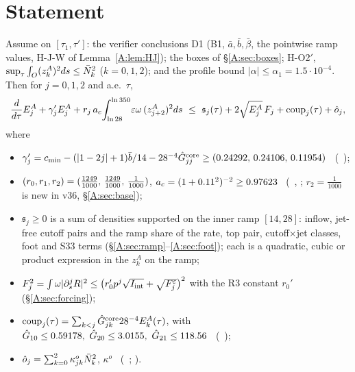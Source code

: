\documentclass[11pt]{article}
\begin{document}
\section{Statement}\label{A:sec:statement}
\begin{proposition}\label{A:prop:level}
Assume on $[\tau_1,\tau']$: the verifier conclusions D1 (B1, $\bar a,\bar b,\bar\beta$, the pointwise ramp values, H-J-W of Lemma~\ref{A:lem:HJ}); the boxes of \S\ref{A:sec:boxes}; H-O2$'$, $\sup_\tau\int_O(z^A_k)^2ds\le\bar N_k^2$ ($k=0,1,2$); and the profile bound $|\alpha|\le\alpha_1=1.5\cdot10^{-4}$. Then for $j=0,1,2$ and a.e.\ $\tau$,
\begin{equation}\label{A:eq:D1}
\frac{d}{d\tau}E^A_j+\gamma'_jE^A_j+r_j\,a_c\!\int_{\ln28}^{\ln350}\!\varepsilon\omega\,(z^A_{j+2})^2ds\ \le\ \mathfrak s_j(\tau)+2\sqrt{E^A_j}\,F_j+\mathrm{coup}_j(\tau)+\oh_j ,
\end{equation}
where
\begin{itemize}[leftmargin=*]
\item $\gamma'_j=c_{\min}-(|1-2j|+1)\bar b/14-28^{-4}\hat G^{\rm core}_{jj}\ge(0.24292,\,0.24106,\,0.11954)$ \tC\ (\SA\ );
\item $(r_0,r_1,r_2)=(\tfrac{1249}{1000},\,\tfrac{1249}{1000},\,\tfrac1{1000})$, $a_c=(1+0.11^2)^{-2}\ge0.97623$ \tC\ (\SA\ , ; $r_2=\frac1{1000}$ is new in v36, \S\ref{A:sec:base});
\item $\mathfrak s_j\ge0$ is a sum of densities supported on the inner ramp $[14,28]$: inflow, jet-free cutoff pairs and the ramp share of the rate, top pair, cutoff$\times$jet classes, foot and S33 terms (\S\ref{A:sec:ramp}--\ref{A:sec:foot}); each is a quadratic, cubic or product expression in the $z^A_k$ on the ramp;
\item $F_j^2=\int\omega|\partial_s^jR|^2\le\bigl(r_0'p^j\sqrt{I_{\rm int}}+\sqrt{F^{\varepsilon}_j}\bigr)^2$ with the R3 constant $r_0'$ (\S\ref{A:sec:forcing});
\item $\mathrm{coup}_j(\tau)=\sum_{k<j}\hat G^{\rm core}_{jk}28^{-4}E^A_k(\tau)$, with $\hat G_{10}\le0.59178,\ \hat G_{20}\le3.0155,\ \hat G_{21}\le118.56$ \tC\ (\SA\ );
\item $\hat o_j=\sum_{k=0}^2\kappa^o_{jk}\bar N_k^2$, $\kappa^o$ \tC\ (\SA\ ; ).
\end{itemize}
\end{proposition}
\end{document}
